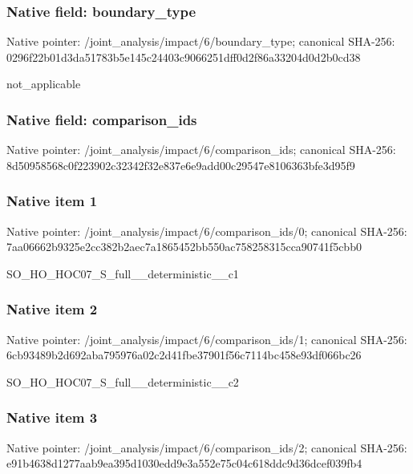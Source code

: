 \documentclass[10pt,a4paper]{article}
\begin{document}
\subsubsection{Native field: boundary\_\allowbreak{}type}
Native pointer: /joint\_\allowbreak{}analysis/impact/6/boundary\_\allowbreak{}type; canonical SHA-256: 0296f22b01d3da51783b5e145c24403c9066251dff0d2f86a33204d0d2b0cd38

\begingroup\raggedright\sloppy not\_\allowbreak{}applicable\par\endgroup

\subsubsection{Native field: comparison\_\allowbreak{}ids}
Native pointer: /joint\_\allowbreak{}analysis/impact/6/comparison\_\allowbreak{}ids; canonical SHA-256: 8d50958568c0f223902c32342f32e837e6e9add00c29547e8106363bfe3d95f9

\subsubsection{Native item 1}
Native pointer: /joint\_\allowbreak{}analysis/impact/6/comparison\_\allowbreak{}ids/0; canonical SHA-256: 7aa06662b9325e2cc382b2aec7a1865452bb550ac758258315cca90741f5cbb0

\begingroup\raggedright\sloppy SO\_\allowbreak{}HO\_\allowbreak{}HOC07\_\allowbreak{}S\_\allowbreak{}full\_\allowbreak{}\_\allowbreak{}deterministic\_\allowbreak{}\_\allowbreak{}c1\par\endgroup

\subsubsection{Native item 2}
Native pointer: /joint\_\allowbreak{}analysis/impact/6/comparison\_\allowbreak{}ids/1; canonical SHA-256: 6cb93489b2d692aba795976a02c2d41fbe37901f56c7114bc458e93df066bc26

\begingroup\raggedright\sloppy SO\_\allowbreak{}HO\_\allowbreak{}HOC07\_\allowbreak{}S\_\allowbreak{}full\_\allowbreak{}\_\allowbreak{}deterministic\_\allowbreak{}\_\allowbreak{}c2\par\endgroup

\subsubsection{Native item 3}
Native pointer: /joint\_\allowbreak{}analysis/impact/6/comparison\_\allowbreak{}ids/2; canonical SHA-256: e91b4638d1277aab9ea395d1030edd9e3a552e75c04c618ddc9d36dcef039fb4
\end{document}
